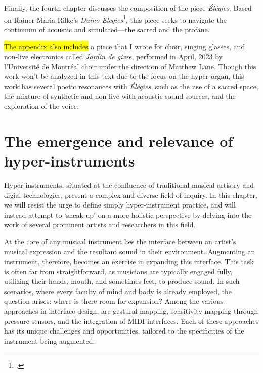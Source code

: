 \documentclass[12pt,twoside,maitrise]{dms_ks}
\theoremstyle{definition}
\begin{document}
Finally, the fourth chapter discusses the composition of the piece \textit{Élégies}. 
Based on Rainer Maria Rilke's \textit{Duino Elegies}\footcite{rilke_egies_1986}, this piece seeks to navigate the continuum of acoustic and simulated---the sacred and the profane.

\hl{The appendix also includes} a piece that I wrote for choir, singing glasses, and non-live electronics called \textit{Jardin de givre}, performed in April, 2023 by l'Université de Montréal choir under the direction of Matthew Lane. Though this work won't be analyzed in this text due to the focus on the hyper-organ, this work has several poetic resonances with \textit{Élégies}, such as the use of a sacred space, the mixture of synthetic and non-live with acoustic sound sources, and the exploration of the voice.



\chapter{The emergence and relevance of hyper-instruments}

Hyper-instruments, situated at the confluence of traditional musical artistry and digial technologies, present a complex and diverse field of inquiry.
In this chapter, we will resist the urge to define simply hyper-instrument practice, and will instead attempt to `sneak up' on a more holistic perspective by delving into the work of several prominent artists and researchers in this field.

At the core of any musical instrument lies the interface between an artist's musical expression and the resultant sound in their environment.
Augmenting an instrument, therefore, becomes an exercise in expanding this interface.
This task is often far from straightforward, as musicians are typically engaged fully, utilizing their hands, mouth, and sometimes feet, to produce sound.
In such scenarios, where every faculty of mind and body is already employed, the question arises: where is there room for expansion?
Among the various approaches in interface design, are gestural mapping, sensitivity mapping through pressure sensors, and the integration of MIDI interfaces.
Each of these approaches has its unique challenges and opportunities, tailored to the specificities of the instrument being augmented.
\end{document}
